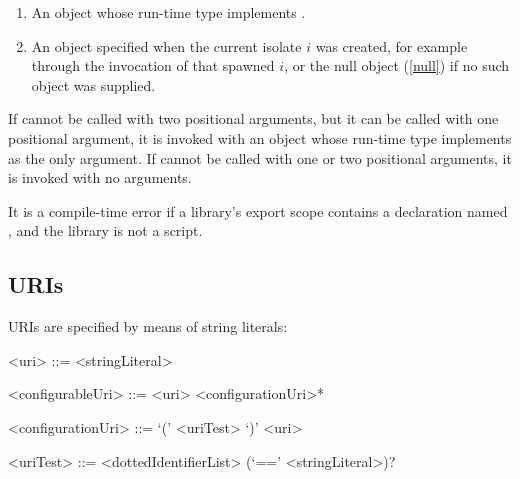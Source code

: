 \documentclass[makeidx]{article}
\begin{document}
{\begin{enumerate}
\item An object whose run-time type implements .
\item An object specified when the current isolate $i$ was created,
for example through the invocation of  that spawned $i$,
or the null object (\ref{null}) if no such object was supplied.
\end{enumerate}

\LMHash{}%
If  cannot be called with two positional arguments,
but it can be called with one positional argument,
it is invoked with an object whose run-time type implements 
as the only argument.
If  cannot be called with one or two positional arguments,
it is invoked with no arguments.



\LMHash{}%
It is a compile-time error if a library's export scope contains a declaration
named , and the library is not a script.


\subsection{URIs}

\LMHash{}%
URIs are specified by means of string literals:

\begin{grammar}
<uri> ::= <stringLiteral>

<configurableUri> ::= <uri> <configurationUri>*

<configurationUri> ::= \IF{} `(' <uriTest> `)' <uri>

<uriTest> ::= <dottedIdentifierList> (`==' <stringLiteral>)?
\end{grammar}

}
\end{document}
